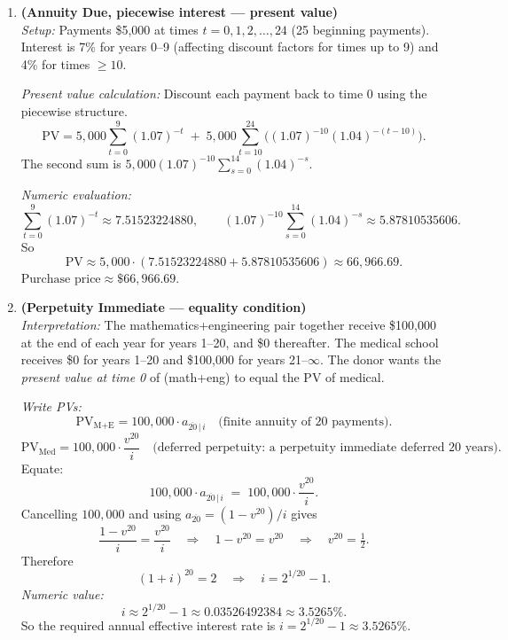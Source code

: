 \documentclass[11pt]{article}
\begin{document}
\begin{enumerate}[leftmargin=*,itemsep=16pt]
\bigskip

\item \textbf{(Annuity Due, piecewise interest — present value)}\\[4pt]
  \emph{Setup:} Payments \$5,000 at times \(t=0,1,2,\dots,24\) (25 beginning payments). Interest is 7\% for years 0–9 (affecting discount factors for times up to 9) and 4\% for times \(\ge 10\).

  \emph{Present value calculation:} Discount each payment back to time 0 using the piecewise structure.
  \[
    \text{PV} = 5{,}000\sum_{t=0}^{9}(1.07)^{-t}
      \;+\;5{,}000\sum_{t=10}^{24}\bigl((1.07)^{-10}(1.04)^{-(t-10)}\bigr).
  \]
  The second sum is \(5{,}000(1.07)^{-10}\sum_{s=0}^{14}(1.04)^{-s}\).

  \emph{Numeric evaluation:}
  \[
    \sum_{t=0}^{9}(1.07)^{-t}\approx 7.51523224880,\qquad
    (1.07)^{-10}\sum_{s=0}^{14}(1.04)^{-s}\approx 5.87810535606.
  \]
  So
  \[
    \text{PV}\approx 5{,}000\cdot(7.51523224880 + 5.87810535606)
      \approx 66{,}966.69.
  \]
  \(\boxed{\text{Purchase price} \approx \$66{,}966.69.}\)

\bigskip

\item \textbf{(Perpetuity Immediate — equality condition)}\\[4pt]
  \emph{Interpretation:} The mathematics+engineering pair together receive \$100,000 at the end of each year for years 1–20, and \$0 thereafter. The medical school receives \$0 for years 1–20 and \$100,000 for years 21–\(\infty\). The donor wants the \emph{present value at time 0} of (math+eng) to equal the PV of medical.

  \emph{Write PVs:}
  \[
    \text{PV}_{\text{M+E}} = 100{,}000\cdot a_{\overline{20}\,|\,i}
    \quad\text{(finite annuity of 20 payments).}
  \]
  \[
    \text{PV}_{\text{Med}} = 100{,}000\cdot\frac{v^{20}}{i}
    \quad\text{(deferred perpetuity: a perpetuity immediate deferred 20 years).}
  \]
  Equate:
  \[
    100{,}000\cdot a_{\overline{20}\,|\,i} \;=\; 100{,}000\cdot\frac{v^{20}}{i}.
  \]
  Cancelling \(100{,}000\) and using \(a_{\overline{20}}=(1-v^{20})/i\) gives
  \[
    \frac{1-v^{20}}{i} = \frac{v^{20}}{i}
    \quad\Rightarrow\quad 1-v^{20}=v^{20} \quad\Rightarrow\quad v^{20}=\tfrac{1}{2}.
  \]
  Therefore
  \[
    (1+i)^{20}=2 \quad\Rightarrow\quad i = 2^{1/20}-1.
  \]
  \emph{Numeric value:}
  \[
    i \approx 2^{1/20}-1 \approx 0.03526492384 \approx 3.5265\%.
  \]
  So the required annual effective interest rate is \(\boxed{i=2^{1/20}-1\approx 3.5265\%}\).


\end{enumerate}
\end{document}
